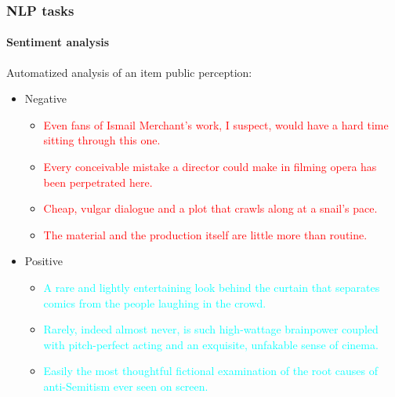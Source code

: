 \documentclass[9pt]{beamer}
\begin{document}
\begin{frame}
  \frametitle{NLP tasks}

  \framesubtitle{Sentiment analysis}

  Automatized analysis of an item public perception:

  {\small
    \begin{itemize}
      \item Negative
        \begin{itemize}
          \item \textcolor{red}{Even fans of Ismail Merchant's work, I suspect,
            would have a hard time sitting through this one.}
          \item \textcolor{red}{Every conceivable mistake a director
            could make in filming opera has been perpetrated here.}
          \item \textcolor{red}{Cheap, vulgar dialogue and a plot that
            crawls along at a snail's pace.}
          \item \textcolor{red}{The material and the production itself
            are little more than routine.}
        \end{itemize}
      \item Positive
        \begin{itemize}
          \item \textcolor{cyan}{A rare and lightly entertaining look
            behind the curtain that separates comics from the people
            laughing in the crowd.}
          \item \textcolor{cyan}{Rarely, indeed almost never, is such
            high-wattage brainpower coupled with pitch-perfect acting
            and an exquisite, unfakable sense of cinema.}
          \item\textcolor{cyan}{Easily the most thoughtful fictional
            examination of the root causes of anti-Semitism ever seen
            on screen.}
        \end{itemize}
    \end{itemize}
  }
\end{frame}
\end{document}
